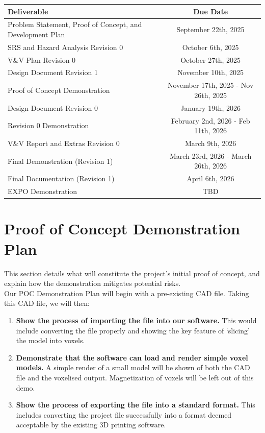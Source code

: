 \documentclass{article}
\begin{document}
\begin{center}
  \begin{tabularx}{\textwidth}{Xc}
    \toprule
    \textbf{Deliverable} & \textbf{Due Date} \\
    \midrule
    Problem Statement, Proof of Concept, and Development Plan &
    September 22th, 2025 \\
    SRS and Hazard Analysis Revision 0 & October 6th, 2025 \\
    V\&V Plan Revision 0 & October 27th, 2025 \\
    Design Document Revision 1 & November 10th, 2025 \\
    Proof of Concept Demonstration & November 17th, 2025 - Nov 26th, 2025 \\
    Design Document Revision 0 & January 19th, 2026 \\
    Revision 0 Demonstration & February 2nd, 2026 - Feb 11th, 2026 \\
    V\&V Report and Extras Revision 0 & March 9th, 2026 \\
    Final Demonstration (Revision 1) & March 23rd, 2026 - March 26th, 2026 \\
    Final Documentation (Revision 1) & April 6th, 2026 \\
    EXPO Demonstration & TBD \\
    \bottomrule
  \end{tabularx}
\end{center}




\section{Proof of Concept Demonstration Plan}

This section details what will constitute the project's initial proof of concept, and explain 
how the demonstration mitigates potential risks.\\

Our POC Demonstration Plan will begin with a pre-existing CAD file. Taking this 
CAD file, we will then:

\begin{enumerate}
  \item \textbf{Show the process of importing the file into our software.} This would include converting the file properly and showing the key feature of `slicing' the model into voxels.
  \item \textbf{Demonstrate that the software can load and render simple voxel models.} A simple render of a small model will be shown of both the CAD file and the voxelised output. Magnetization of voxels will be left out of this demo.
  \item \textbf{Show the process of exporting the file into a standard format.} This includes converting the project file successfully into a format deemed acceptable by the existing 3D printing software.
\end{enumerate}
\end{document}
